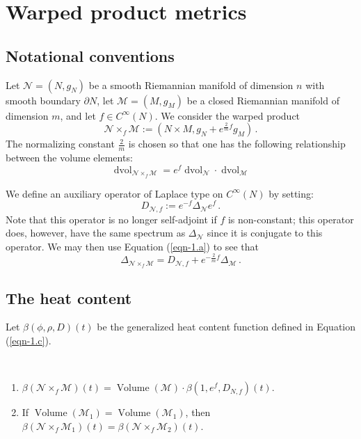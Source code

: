 \documentclass{amsart}
\begin{document}
\section{Warped product metrics}\label{sect-3}
\subsection{Notational conventions}
Let
$\mathcal{N}=(N,g_N)$ be a smooth Riemannian manifold  of dimension $n$ with smooth boundary $\partial N$, let
$\mathcal{M}=(M,g_M)$ be a closed Riemannian manifold of dimension $m$, and let $f\in C^\infty(N)$. We
consider the warped product
$$\mathcal{N}\times_f\mathcal{M}:=(N\times M,g_N+e^{\frac2mf}g_M)\,.$$
The normalizing constant $\frac2m$ is chosen so that one has the following relationship between the volume
elements:
\begin{equation}\label{eqn-3.a}
\operatorname{dvol}_{\mathcal{N}\times_f\mathcal{M}}=e^f\operatorname{dvol}_{\mathcal{N}}
\cdot\operatorname{dvol}_{\mathcal{M}}
\end{equation}

We define an auxiliary operator of Laplace type on $C^\infty(N)$ by setting:
$$D_{\mathcal{N},f}:=e^{-f}\Delta_{\mathcal{N}}e^{f}\,.$$
Note that this operator is no longer self-adjoint if $f$ is non-constant; this operator does, however, have the
same spectrum as $\Delta_{\mathcal{N}}$ since it is conjugate to this operator. We may then use Equation
(\ref{eqn-1.a}) to see that
\begin{equation}\label{eqn-3.b}
\Delta_{\mathcal{N}\times_f\mathcal{M}}=D_{\mathcal{N},f}+e^{-\frac2mf}\Delta_{\mathcal{M}}\,.
\end{equation}

\subsection{The heat content}
Let $\beta(\phi,\rho,D)(t)$ be the generalized heat content
function defined in Equation (\ref{eqn-1.c}).

\begin{theorem}\label{thm-3.1}\ \begin{enumerate}
\item
$\beta(\mathcal{N}\times_f\mathcal{M})(t)=\operatorname{Volume}(\mathcal{M})\cdot\beta(1,e^{f},D_{N,f})(t)$.
\item If $\operatorname{Volume}(\mathcal{M}_1)=\operatorname{Volume}(\mathcal{M}_1)$, then
$\beta(\mathcal{N}\times_f\mathcal{M}_1)(t)=\beta(\mathcal{N}\times_f\mathcal{M}_2)(t)$.
\end{enumerate}
\end{theorem}
\end{document}
